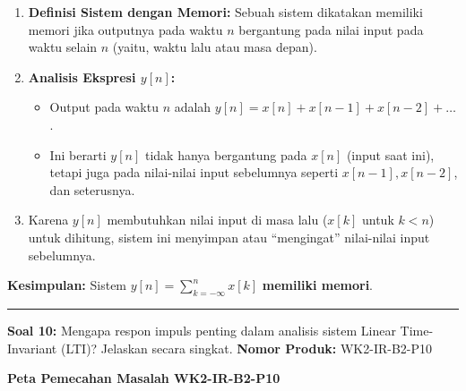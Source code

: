 \documentclass[
  letterpaper,
  DIV=11,
  numbers=noendperiod]{scrreprt}
\providecommand{\tightlist}{%
  \setlength{\itemsep}{0pt}\setlength{\parskip}{0pt}}
\begin{document}
\begin{enumerate}
\def\labelenumi{\arabic{enumi}.}
\tightlist
\item
  \textbf{Definisi Sistem dengan Memori:} Sebuah sistem dikatakan
  memiliki memori jika outputnya pada waktu \(n\) bergantung pada nilai
  input pada waktu selain \(n\) (yaitu, waktu lalu atau masa depan).
\item
  \textbf{Analisis Ekspresi \(y[n]\):}

  \begin{itemize}
  \tightlist
  \item
    Output pada waktu \(n\) adalah
    \(y[n] = x[n] + x[n-1] + x[n-2] + \dots\).
  \item
    Ini berarti \(y[n]\) tidak hanya bergantung pada \(x[n]\) (input
    saat ini), tetapi juga pada nilai-nilai input sebelumnya seperti
    \(x[n-1], x[n-2]\), dan seterusnya.
  \end{itemize}
\item
  Karena \(y[n]\) membutuhkan nilai input di masa lalu (\(x[k]\) untuk
  \(k < n\)) untuk dihitung, sistem ini menyimpan atau ``mengingat''
  nilai-nilai input sebelumnya.
\end{enumerate}

\textbf{Kesimpulan:} Sistem \(y[n] = \sum_{k=-\infty}^{n} x[k]\)
\textbf{memiliki memori}.

\begin{center}\rule{0.5\linewidth}{0.5pt}\end{center}

\textbf{Soal 10:} Mengapa respon impuls penting dalam analisis sistem
Linear Time-Invariant (LTI)? Jelaskan secara singkat. \textbf{Nomor
Produk:} WK2-IR-B2-P10

\textbf{Peta Pemecahan Masalah WK2-IR-B2-P10}
\end{document}
